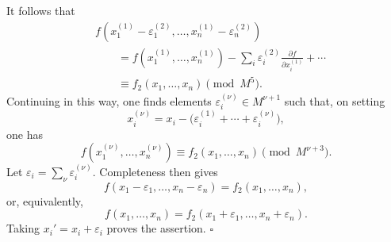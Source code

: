 
It follows that
\[
\begin{aligned}
&f(x_1^{(1)}-\varepsilon_1^{(2)},\ldots,
  x_n^{(1)}-\varepsilon_n^{(2)})\\
&\qquad =f(x_1^{(1)},\ldots,x_n^{(1)})
 -\sum_i\varepsilon_i^{(2)}
       \frac{\partial f}{\partial x_i^{(1)}}+\cdots\\
&\qquad \equiv f_2(x_1,\ldots,x_n)\pmod{M^5}.
\end{aligned}
\]
Continuing in this way, one finds elements
$\varepsilon_i^{(\nu)}\in M^{\nu+1}$ such that, on setting
\[
x_i^{(\nu)}
=x_i-\bigl(\varepsilon_i^{(1)}+\cdots+
            \varepsilon_i^{(\nu)}\bigr),
\]
one has
\[
f(x_1^{(\nu)},\ldots,x_n^{(\nu)})
\equiv f_2(x_1,\ldots,x_n)\pmod{M^{\nu+3}}.
\]
Let $\varepsilon_i=\sum_\nu\varepsilon_i^{(\nu)}$. Completeness then
gives
\[
f(x_1-\varepsilon_1,\ldots,x_n-\varepsilon_n)
=f_2(x_1,\ldots,x_n),
\]
or, equivalently,
\[
f(x_1,\ldots,x_n)
=f_2(x_1+\varepsilon_1,\ldots,x_n+\varepsilon_n).
\]
Taking $x_i'=x_i+\varepsilon_i$ proves the assertion.
\hfill$\square$
